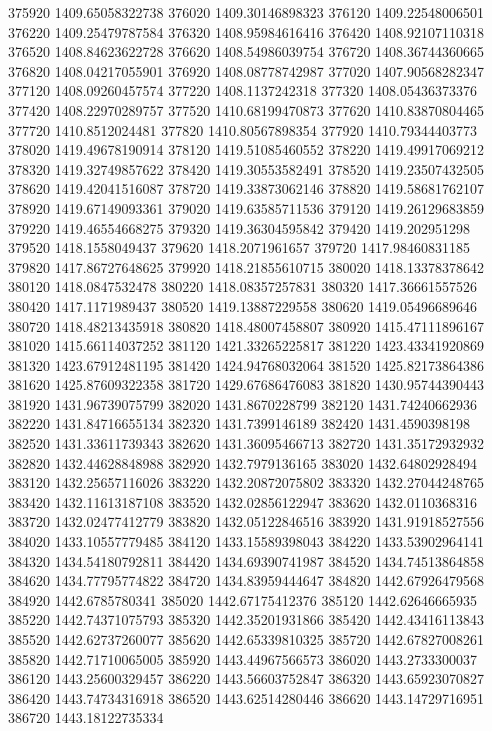 {375920 1409.65058322738
376020 1409.30146898323
376120 1409.22548006501
376220 1409.25479787584
376320 1408.95984616416
376420 1408.92107110318
376520 1408.84623622728
376620 1408.54986039754
376720 1408.36744360665
376820 1408.04217055901
376920 1408.08778742987
377020 1407.90568282347
377120 1408.09260457574
377220 1408.1137242318
377320 1408.05436373376
377420 1408.22970289757
377520 1410.68199470873
377620 1410.83870804465
377720 1410.8512024481
377820 1410.80567898354
377920 1410.79344403773
378020 1419.49678190914
378120 1419.51085460552
378220 1419.49917069212
378320 1419.32749857622
378420 1419.30553582491
378520 1419.23507432505
378620 1419.42041516087
378720 1419.33873062146
378820 1419.58681762107
378920 1419.67149093361
379020 1419.63585711536
379120 1419.26129683859
379220 1419.46554668275
379320 1419.36304595842
379420 1419.202951298
379520 1418.1558049437
379620 1418.2071961657
379720 1417.98460831185
379820 1417.86727648625
379920 1418.21855610715
380020 1418.13378378642
380120 1418.0847532478
380220 1418.08357257831
380320 1417.36661557526
380420 1417.1171989437
380520 1419.13887229558
380620 1419.05496689646
380720 1418.48213435918
380820 1418.48007458807
380920 1415.47111896167
381020 1415.66114037252
381120 1421.33265225817
381220 1423.43341920869
381320 1423.67912481195
381420 1424.94768032064
381520 1425.82173864386
381620 1425.87609322358
381720 1429.67686476083
381820 1430.95744390443
381920 1431.96739075799
382020 1431.8670228799
382120 1431.74240662936
382220 1431.84716655134
382320 1431.7399146189
382420 1431.4590398198
382520 1431.33611739343
382620 1431.36095466713
382720 1431.35172932932
382820 1432.44628848988
382920 1432.7979136165
383020 1432.64802928494
383120 1432.25657116026
383220 1432.20872075802
383320 1432.27044248765
383420 1432.11613187108
383520 1432.02856122947
383620 1432.0110368316
383720 1432.02477412779
383820 1432.05122846516
383920 1431.91918527556
384020 1433.10557779485
384120 1433.15589398043
384220 1433.53902964141
384320 1434.54180792811
384420 1434.69390741987
384520 1434.74513864858
384620 1434.77795774822
384720 1434.83959444647
384820 1442.67926479568
384920 1442.6785780341
385020 1442.67175412376
385120 1442.62646665935
385220 1442.74371075793
385320 1442.35201931866
385420 1442.43416113843
385520 1442.62737260077
385620 1442.65339810325
385720 1442.67827008261
385820 1442.71710065005
385920 1443.44967566573
386020 1443.2733300037
386120 1443.25600329457
386220 1443.56603752847
386320 1443.65923070827
386420 1443.74734316918
386520 1443.62514280446
386620 1443.14729716951
386720 1443.18122735334
}
